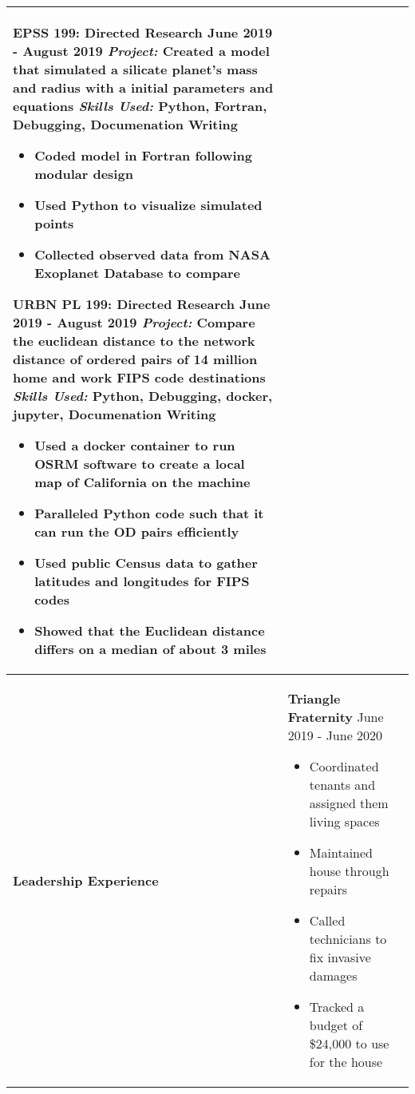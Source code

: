 \documentclass[10pt]{article}
\newcommand*\leftright[2]{%
  \leavevmode
  \rlap{#1}%
  \hspace{0.5\linewidth}%
  #2}
\begin{document}
\begin{longtable}{l l l l}
{        \textbf{EPSS 199: Directed Research} \newline
        \leftright{\textit{Advisor:} Lars Stixrude}{June 2019 - August 2019} \newline
        \textit{Project:} Created a model that simulated a silicate planet's mass and radius with a initial parameters and equations \newline
        \textit{Skills Used:} Python, Fortran, Debugging, Documenation Writing
        \begin{itemize}[noitemsep,nolistsep]
            \item Coded model in Fortran following modular design
            \item Used Python to visualize simulated points
            \item Collected observed data from NASA Exoplanet Database to compare
        \end{itemize}
        
        \textbf{URBN PL 199: Directed Research} \newline
        \leftright{\textit{Advisor:} Evelyn Blumenberg}{June 2019 - August 2019} \newline
        \textit{Project:} Compare the euclidean distance to the network distance of ordered pairs of 14 million home and work FIPS code destinations \newline
        \textit{Skills Used:} Python, Debugging, docker, jupyter, Documenation Writing
        \begin{itemize}[noitemsep,nolistsep]
            \item Used a docker container to run OSRM software to create a local map of California on the machine
            \item Paralleled Python code such that it can run the OD pairs efficiently
            \item Used public Census data to gather latitudes and longitudes for FIPS codes
            \item Showed that the Euclidean distance differs on a median of about 3 miles
        \end{itemize}
        
        \baselineskip} \\ \hline
    \multicolumn{1}{p{2 cm}}{\textbf{Leadership \newline Experience}}  &
        \multicolumn{3}{p{16cm}}{
        \textbf{Triangle Fraternity} \newline
        \leftright{\textit{House Manager}}{June 2019 - June 2020}
        \begin{itemize}[noitemsep,nolistsep]
            \item Coordinated tenants and assigned them living spaces
            \item Maintained house through repairs
            \item Called technicians to fix invasive damages
            \item Tracked a budget of \$24,000 to use for the house
        \end{itemize}
        
}
\end{longtable}
\end{document}
